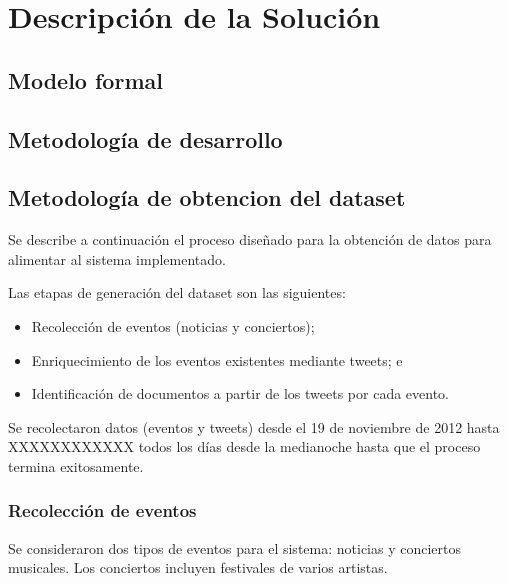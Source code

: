 \chapter{Descripción de la Solución}
\label{sec-4}

\section{Modelo formal}
\label{sec-4.1}

\section{Metodología de desarrollo}
\label{sec-4.2}

\section{Metodología de obtencion del dataset}
\label{sec-4.3}


Se describe a continuación el proceso diseñado para la obtención de
datos para alimentar al sistema implementado.

Las etapas de generación del dataset son las siguientes:

\begin{itemize}
\item Recolección de eventos (noticias y conciertos);
\item Enriquecimiento de los eventos existentes mediante tweets; e
\item Identificación de documentos a partir de los tweets por cada evento.
\end{itemize}
Se recolectaron datos (eventos y tweets) desde el 19 de noviembre de
2012 hasta XXXXXXXXXXXX todos los días desde la medianoche hasta que
el proceso termina exitosamente.

\subsection{Recolección de eventos}
\label{sec-4.3.1}


Se consideraron dos tipos de eventos para el sistema: noticias y
conciertos musicales. Los conciertos incluyen festivales de varios
artistas.

